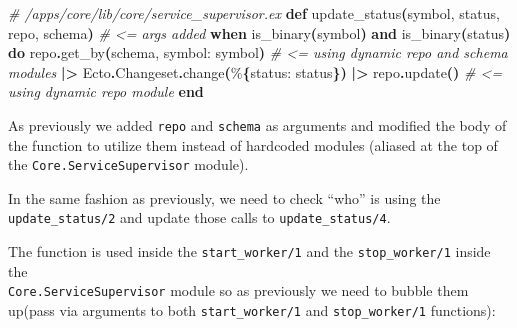 \documentclass[
  oneside]{book}
\newenvironment{Shaded}{\begin{snugshade}}{\end{snugshade}}
\newcommand{\CommentTok}[1]{\textcolor[rgb]{0.56,0.35,0.01}{\textit{#1}}}
\newcommand{\ConstantTok}[1]{\textcolor[rgb]{0.56,0.35,0.01}{#1}}
\newcommand{\FunctionTok}[1]{\textcolor[rgb]{0.13,0.29,0.53}{\textbf{#1}}}
\newcommand{\KeywordTok}[1]{\textcolor[rgb]{0.13,0.29,0.53}{\textbf{#1}}}
\newcommand{\NormalTok}[1]{#1}
\newcommand{\OperatorTok}[1]{\textcolor[rgb]{0.81,0.36,0.00}{\textbf{#1}}}
\newcommand{\VariableTok}[1]{\textcolor[rgb]{0.00,0.00,0.00}{#1}}
\begin{document}
\begin{Shaded}
\begin{Highlighting}[]
  \CommentTok{\# /apps/core/lib/core/service\_supervisor.ex}
  \KeywordTok{def}\NormalTok{ update\_status}\FunctionTok{(}\NormalTok{symbol, status, repo, schema}\FunctionTok{)} \CommentTok{\# \textless{}= args added}
      \KeywordTok{when}\NormalTok{ is\_binary}\FunctionTok{(}\NormalTok{symbol}\FunctionTok{)} \KeywordTok{and}\NormalTok{ is\_binary}\FunctionTok{(}\NormalTok{status}\FunctionTok{)} \KeywordTok{do}
\NormalTok{    repo}\OperatorTok{.}\NormalTok{get\_by}\FunctionTok{(}\NormalTok{schema, }\VariableTok{symbol:}\NormalTok{ symbol}\FunctionTok{)} \CommentTok{\# \textless{}= using dynamic repo and schema modules}
    \OperatorTok{|\textgreater{}} \ConstantTok{Ecto}\OperatorTok{.}\ConstantTok{Changeset}\OperatorTok{.}\NormalTok{change}\FunctionTok{(}\NormalTok{\%}\FunctionTok{\{}\VariableTok{status:}\NormalTok{ status}\FunctionTok{\})}
    \OperatorTok{|\textgreater{}}\NormalTok{ repo}\OperatorTok{.}\NormalTok{update}\FunctionTok{()} \CommentTok{\# \textless{}= using dynamic repo module}
  \KeywordTok{end}
\end{Highlighting}
\end{Shaded}

As previously we added \texttt{repo} and \texttt{schema} as arguments and modified the body of the function to utilize them instead of hardcoded modules (aliased at the top of the \texttt{Core.ServiceSupervisor} module).

In the same fashion as previously, we need to check ``who'' is using the \texttt{update\_status/2} and update those calls to \texttt{update\_status/4}.

The function is used inside the \texttt{start\_worker/1} and the \texttt{stop\_worker/1} inside the\\
\texttt{Core.ServiceSupervisor} module so as previously we need to bubble them up(pass via arguments to both \texttt{start\_worker/1} and \texttt{stop\_worker/1} functions):
\end{document}
